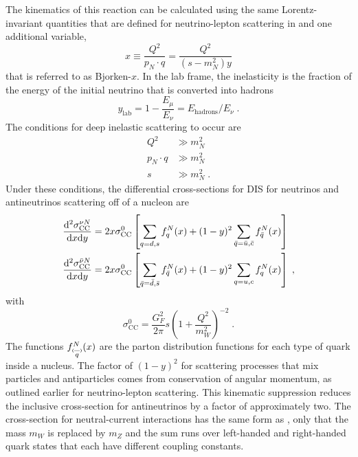 The kinematics of this reaction can be calculated using the same Lorentz-invariant quantities that are defined for neutrino-lepton scattering in  and one additional variable,
\begin{equation}
    x\equiv \frac{Q^2}{p_N \cdot q} = \frac{Q^2}{(s-m_N^2)y}
\end{equation}
that is referred to as Bjorken-$x$. In the lab frame, the inelasticity is the fraction of the energy of the initial neutrino that is converted into hadrons
\begin{equation}
    y_\mathrm{lab} = 1 -\frac{E_\mu}{E_\nu} = E_\mathrm{hadrons}/E_\nu\;.
\end{equation}
The conditions for deep inelastic scattering to occur are
\begin{equation}
\begin{aligned}
    Q^2 &\gg m_N^2 \\
    p_N \cdot q &\gg m_N^2 \\
    s &\gg m_N^2\;.
\end{aligned}
\end{equation}
Under these conditions, the differential cross-sections for DIS for neutrinos and antineutrinos scattering off of a nucleon are
\begin{equation}
\begin{aligned}
    \frac{\mathrm{d}^2 \sigma_\mathrm{CC}^{\nu N}}{\mathrm{d} x \mathrm{d} y}
    &= 2x\sigma^0_\mathrm{CC} \left[
        \sum_{q=d,s} f_q^N(x) + (1 - y)^2\sum_{\bar{q}=\bar{u},\bar{c}} f_{\bar{q}}^N(x)
    \right] \\
    \frac{\mathrm{d}^2 \sigma_\mathrm{CC}^{\bar{\nu} N}}{\mathrm{d} x \mathrm{d} y}
    &= 2x\sigma^0_\mathrm{CC} \left[
        \sum_{\bar{q}=\bar{d},\bar{s}} f_{\bar{q}}^N(x) + (1 - y)^2\sum_{q=u,c} f_q^N(x)
    \right]\;,
\end{aligned}\label{eq:ccdis-xsec}
\end{equation}
with
\begin{equation}
    \sigma_\mathrm{CC}^0 = \frac{G_F^2}{2\pi}s \left( 1 + \frac{Q^2}{m_W^2} \right)^{-2}\;.
\end{equation}
The functions $f_{\pbar{q}}^N(x)$ are the parton distribution functions for each type of quark inside a nucleus. The factor of $(1 - y)^2$ for scattering processes that mix particles and antiparticles comes from conservation of angular momentum, as outlined earlier for neutrino-lepton scattering. This kinematic suppression reduces the inclusive cross-section for antineutrinos by a factor of approximately two. The cross-section for neutral-current interactions has the same form as , only that the mass $m_W$ is replaced by $m_Z$ and the sum runs over left-handed and right-handed quark states that each have different coupling constants.
